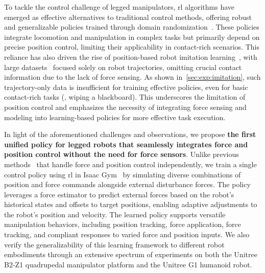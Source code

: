 \documentclass{article}
\begin{document}
To tackle the control challenge of legged manipulators, \ac{rl} algorithms have emerged as effective alternatives to traditional control methods, offering robust and generalizable policies trained through domain randomization~\cite{fu2023deep,liu2024visual,qiu2024wildlma,portela2024learning,zhuang2024humanoid,zhuang2023robot}. These policies integrate locomotion and manipulation in complex tasks but primarily depend on precise position control, limiting their applicability in contact-rich scenarios. This reliance has also driven the rise of position-based robot imitation learning~\cite{shridhar2023perceiver, chi2023diffusion,brohan2023rt,team2024octo,black2024pi_0}, with large datasets~\cite{walke2023bridgedata, brohan2023rt, khazatsky2024droid, o2024open} focused solely on robot trajectories, omitting crucial contact information due to the lack of force sensing. As shown in~\cref{sec:exp:imitation}, such trajectory-only data is insufficient for training effective policies, even for basic contact-rich tasks (\eg, wiping a blackboard). This underscores the limitation of position control and emphasizes the necessity of integrating force sensing and modeling into learning-based policies for more effective task execution.

In light of the aforementioned challenges and observations, we propose \textbf{the first unified policy for legged robots that seamlessly integrates force and position control without the need for force sensors}. Unlike previous methods~\cite{portela2024learning} that handle force and position control independently, we train a single control policy using \ac{rl} in Isaac Gym~\cite{makoviychuk2021isaac} by simulating diverse combinations of position and force commands alongside external disturbance forces. The policy leverages a force estimator to predict external forces based on the robot's historical states and offsets to target positions, enabling adaptive adjustments to the robot's position and velocity. The learned policy supports versatile manipulation behaviors, including position tracking, force application, force tracking, and compliant responses to varied force and position inputs. We also verify the generalizability of this learning framework to different robot embodiments through an extensive spectrum of \numtask experiments on both the Unitree B2-Z1 quadrupedal manipulator platform and the Unitree G1 humanoid robot.
\end{document}

